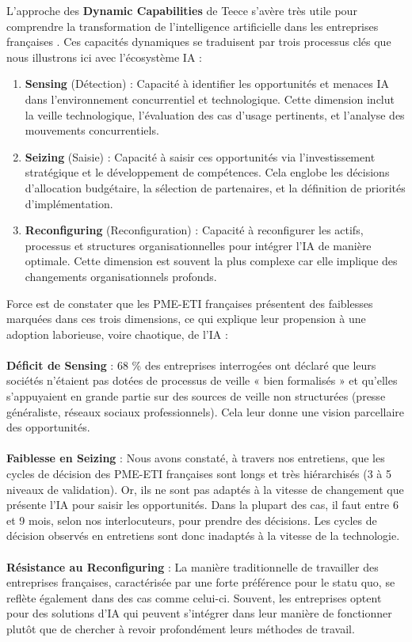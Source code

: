 L’approche des \textbf{Dynamic Capabilities} de Teece s’avère très utile pour comprendre la transformation de l’intelligence artificielle dans les entreprises françaises \cite{teece2007dynamic}. Ces capacités dynamiques se traduisent par trois processus clés que nous illustrons ici avec l’écosystème IA :

\begin{enumerate}
    \item \textbf{Sensing} (Détection) : Capacité à identifier les opportunités et menaces IA dans l'environnement concurrentiel et technologique. Cette dimension inclut la veille technologique, l'évaluation des cas d'usage pertinents, et l'analyse des mouvements concurrentiels.
    
    \item \textbf{Seizing} (Saisie) : Capacité à saisir ces opportunités via l'investissement stratégique et le développement de compétences. Cela englobe les décisions d'allocation budgétaire, la sélection de partenaires, et la définition de priorités d'implémentation.
    
    \item \textbf{Reconfiguring} (Reconfiguration) : Capacité à reconfigurer les actifs, processus et structures organisationnelles pour intégrer l'IA de manière optimale. Cette dimension est souvent la plus complexe car elle implique des changements organisationnels profonds.
\end{enumerate}
\medskip
Force est de constater que les PME-ETI françaises présentent des faiblesses marquées dans ces trois dimensions, ce qui explique leur propension à une adoption laborieuse, voire chaotique, de l'IA :
\\\\
\textbf{Déficit de Sensing} : 68 \% des entreprises interrogées ont déclaré que leurs sociétés n’étaient pas dotées de processus de veille « bien formalisés » et qu’elles s’appuyaient en grande partie sur des sources de veille non structurées (presse généraliste, réseaux sociaux professionnels). Cela leur donne une vision parcellaire des opportunités.
\\\\
\textbf{Faiblesse en Seizing} : Nous avons constaté, à travers nos entretiens, que les cycles de décision des PME-ETI françaises sont longs et très hiérarchisés (3 à 5 niveaux de validation). Or, ils ne sont pas adaptés à la vitesse de changement que présente l'IA pour saisir les opportunités. Dans la plupart des cas, il faut entre 6 et 9 mois, selon nos interlocuteurs, pour prendre des décisions. Les cycles de décision observés en entretiens sont donc inadaptés à la vitesse de la technologie.
\\\\
\textbf{Résistance au Reconfiguring} : La manière traditionnelle de travailler des entreprises françaises, caractérisée par une forte préférence pour le statu quo, se reflète également dans des cas comme celui-ci. Souvent, les entreprises optent pour des solutions d'IA qui peuvent s'intégrer dans leur manière de fonctionner plutôt que de chercher à revoir profondément leurs méthodes de travail.

